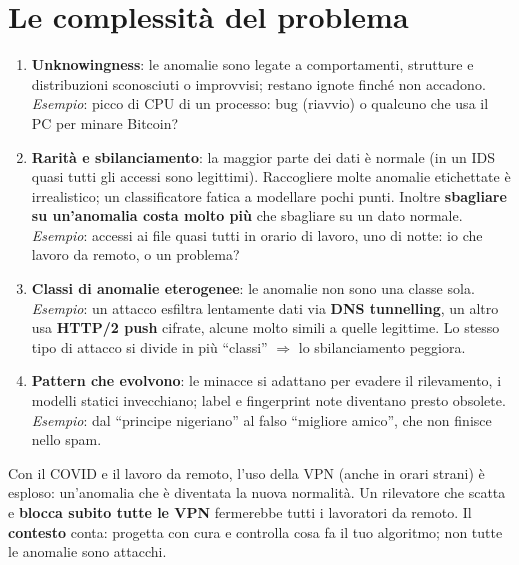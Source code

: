 \section{Le complessità del problema}
\begin{enumerate}
  \item \textbf{Unknowingness}: le anomalie sono legate a comportamenti, strutture e distribuzioni sconosciuti o improvvisi; restano ignote finché
        non accadono. \emph{Esempio}: picco di CPU di un processo: bug (riavvio) o qualcuno che usa il PC per minare Bitcoin?
  \item \textbf{Rarità e sbilanciamento}: la maggior parte dei dati è normale (in un IDS quasi tutti gli accessi sono legittimi).
        Raccogliere molte anomalie etichettate è irrealistico; un classificatore fatica a modellare pochi punti. Inoltre
        \textbf{sbagliare su un'anomalia costa molto più} che sbagliare su un dato normale. \emph{Esempio}: accessi ai file quasi tutti in orario
        di lavoro, uno di notte: io che lavoro da remoto, o un problema?
  \item \textbf{Classi di anomalie eterogenee}: le anomalie non sono una classe sola. \emph{Esempio}: un attacco esfiltra lentamente dati via
        \textbf{DNS tunnelling}, un altro usa \textbf{HTTP/2 push} cifrate, alcune molto simili a quelle legittime. Lo stesso tipo di attacco si
        divide in più ``classi'' $\Rightarrow$ lo sbilanciamento peggiora.
  \item \textbf{Pattern che evolvono}: le minacce si adattano per evadere il rilevamento, i modelli statici invecchiano; label e fingerprint
        note diventano presto obsolete. \emph{Esempio}: dal ``principe nigeriano'' al falso ``migliore amico'', che non finisce nello spam.
\end{enumerate}
\begin{attenzione}
Con il COVID e il lavoro da remoto, l'uso della VPN (anche in orari strani) è esploso: un'anomalia che è diventata la nuova normalità.
Un rilevatore che scatta e \textbf{blocca subito tutte le VPN} fermerebbe tutti i lavoratori da remoto. Il \textbf{contesto} conta:
progetta con cura e controlla cosa fa il tuo algoritmo; non tutte le anomalie sono attacchi.
\end{attenzione}

